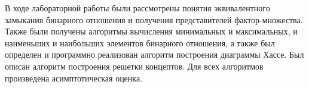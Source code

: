 \documentclass[bachelor, och, labwork]{shiza}
\begin{document}




    





\conclusion
В ходе лабораторной работы были рассмотрены понятия эквивалентного замыкания
бинарного отношения и получения представителей фактор-множества. Также были
получены алгоритмы вычисления минимальных и максимальных, и наименьших и наибольших
элементов бинарного отношения, а также был определен и программно реализован
алгоритм построения диаграммы Хассе. Был описан алгоритм построения решетки
концептов. Для всех алгоритмов произведена асимптотическая оценка.
\end{document}
